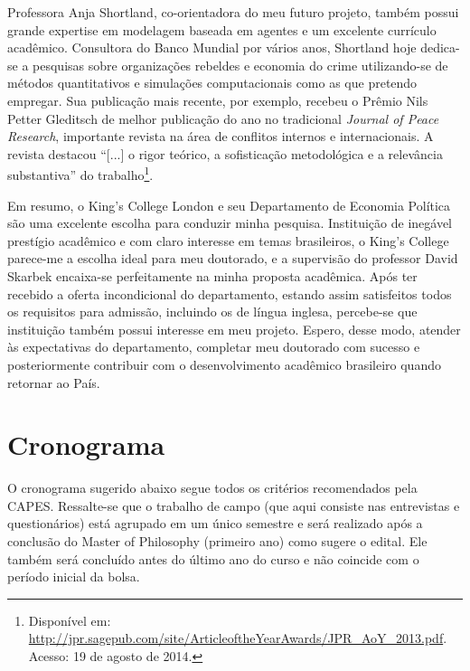 \documentclass[a4paper,11pt]{article}
\begin{document}
Professora Anja Shortland, co-orientadora do meu futuro projeto, também possui grande expertise em modelagem baseada em agentes e um excelente currículo acadêmico. Consultora do Banco Mundial por vários anos, Shortland hoje dedica-se a pesquisas sobre organizações rebeldes e economia do crime utilizando-se de métodos quantitativos e simulações computacionais como as que pretendo empregar. Sua publicação mais recente, por exemplo, recebeu o Prêmio Nils Petter Gleditsch de melhor publicação do ano no tradicional \textit{Journal of Peace Research}, importante revista na área de conflitos internos e internacionais. A revista destacou ``[...] o rigor teórico, a sofisticação metodológica e a relevância substantiva'' do trabalho\footnote{Disponível em: \href{http://jpr.sagepub.com/site/ArticleoftheYearAwards/JPR_AoY_2013.pdf}{http://jpr.sagepub.com/site/ArticleoftheYearAwards/JPR\_AoY\_2013.pdf}. Acesso: 19 de agosto de 2014.}. 

Em resumo, o King's College London e seu Departamento de Economia Política são uma excelente escolha para conduzir minha pesquisa. Instituição de inegável prestígio acadêmico e com claro interesse em temas brasileiros, o King's College parece-me a escolha ideal para meu doutorado, e a supervisão do professor David Skarbek encaixa-se perfeitamente na minha proposta acadêmica. Após ter recebido a oferta incondicional do departamento, estando assim satisfeitos todos os requisitos para admissão, incluindo os de língua inglesa, percebe-se que instituição também possui interesse em meu projeto. Espero, desse modo, atender às expectativas do departamento, completar meu doutorado com sucesso e posteriormente contribuir com o desenvolvimento acadêmico brasileiro quando retornar ao País.

\section{Cronograma}

O cronograma sugerido abaixo segue todos os critérios recomendados pela CAPES. Ressalte-se que o trabalho de campo (que aqui consiste nas entrevistas e questionários) está agrupado em um único semestre e será realizado após a conclusão do Master of Philosophy (primeiro ano) como sugere o edital. Ele também será concluído antes do último ano do curso e não coincide com o período inicial da bolsa.
\end{document}
